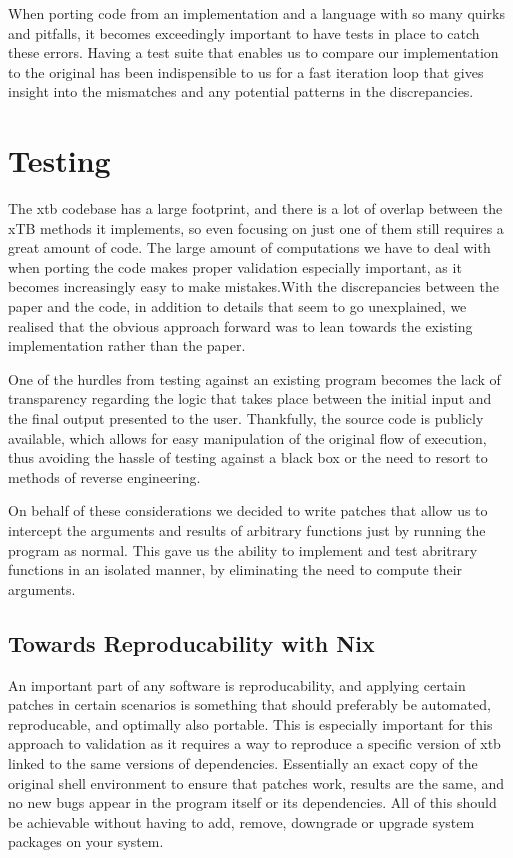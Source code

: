 When porting code from an implementation and a language with so many quirks and pitfalls, it becomes exceedingly important to have tests in place to catch these errors. Having a test suite that enables us to compare our implementation to the original has been indispensible to us for a fast iteration loop that gives insight into the mismatches and any potential patterns in the discrepancies.


\section{Testing}\label{sec:testing}

The xtb codebase has a large footprint, and there is a lot of overlap between the xTB methods it implements, so even focusing on just one of them still requires a great amount of code.
The large amount of computations we have to deal with when porting the code makes proper validation especially important, as it becomes increasingly easy to make mistakes.With the discrepancies between the paper and the code, in addition to details that seem to go unexplained, we realised that the obvious approach forward was to lean towards the existing implementation rather than the paper.

One of the hurdles from testing against an existing program becomes the lack of transparency regarding the logic that takes place between the initial input and the final output presented to the user. Thankfully, the source code is publicly available, which allows for easy manipulation of the original flow of execution, thus avoiding the hassle of testing against a black box or the need to resort to methods of reverse engineering.

On behalf of these considerations we decided to write patches that allow us to intercept the arguments and results of arbitrary functions just by running the program as normal. This gave us the ability to implement and test abritrary functions in an isolated manner, by eliminating the need to compute their arguments.

\subsection{Towards Reproducability with Nix}

An important part of any software is reproducability, and applying certain patches in certain scenarios is something that should preferably be automated, reproducable, and optimally also portable. This is especially important for this approach to validation as it requires a way to reproduce a specific version of xtb linked to the same versions of dependencies. Essentially an exact copy of the original shell environment to ensure that patches work, results are the same, and no new bugs appear in the program itself or its dependencies. All of this should be achievable without having to add, remove, downgrade or upgrade system packages on your system.

